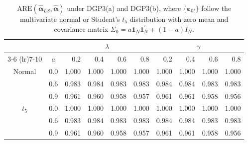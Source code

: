 \begin{table}[htbp]
	\centering
	\renewcommand{\arraystretch}{0.85}
	\caption{\label{tab_ARE} $\text{ARE}(\widehat{\bm \alpha}_{LS}, \widehat{\bm \alpha})$ under DGP3(a) and DGP3(b), where $\{\bm \varepsilon_{0t}\}$ follow the multivariate normal or Student's $t_5$ distribution with zero mean and covariance matrix $\Sigma_{0} = a\bm 1_N \bm 1_N^\prime+(1-a)I_N$. }
	\begin{tabular}{crrrrrrrrr}
		\toprule
		&& \multicolumn{4}{c}{$\lambda$} & \multicolumn{4}{c}{$\gamma$}  \\
		\cmidrule(lr){3-6} \cmidrule(lr){7-10}
		&\multicolumn{1}{c}{$a$} & 0.2 & 0.4 & 0.6 & 0.8 & 0.2 & 0.4 & 0.6 & 0.8 \\
\midrule
Normal & 0.0 & 1.000 & 1.000 & 1.000 & 1.000 & 1.000 & 1.000 & 1.000 & 1.000 \\
 & 0.6 & 0.983 & 0.984 & 0.983 & 0.983 & 0.984 & 0.984 & 0.983 & 0.983 \\
 & 0.9 & 0.961 & 0.960 & 0.958 & 0.957 & 0.961 & 0.961 & 0.958 & 0.956 \\
\midrule
$t_5$ & 0.0 & 1.000 & 1.000 & 1.000 & 1.000 & 1.000 & 1.000 & 1.000 & 1.000 \\
 & 0.6 & 0.983 & 0.984 & 0.983 & 0.983 & 0.984 & 0.984 & 0.983 & 0.983 \\
 & 0.9 & 0.961 & 0.960 & 0.958 & 0.957 & 0.961 & 0.961 & 0.958 & 0.956 \\
		\bottomrule
	\end{tabular}%
\end{table}
